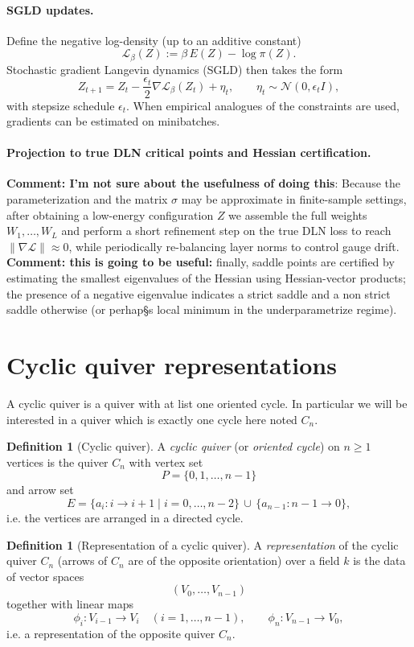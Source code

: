 \documentclass{article}
\theoremstyle{definition}
\newtheorem{definition}[theorem]{Definition}
\begin{document}
\paragraph{SGLD updates.}
Define the negative log-density (up to an additive constant)
\[
\mathcal{L}_\beta(Z) := \beta\,E(Z) - \log \pi(Z).
\]
Stochastic gradient Langevin dynamics (SGLD) then takes the form
\[
Z_{t+1}
=
Z_t
-
\frac{\epsilon_t}{2}\nabla \mathcal{L}_\beta(Z_t)
+
\eta_t,
\qquad
\eta_t \sim \mathcal{N}(0,\epsilon_t I),
\]
with stepsize schedule \(\epsilon_t\). When empirical analogues of the constraints are used, gradients can be estimated on minibatches.

\paragraph{Projection to true DLN critical points and Hessian certification.}
\textbf{Comment: I'm not sure about the usefulness of doing this}: Because the parameterization and the matrix \(\sigma\) may be approximate in finite-sample settings, after obtaining a low-energy configuration \(Z\) we assemble the full weights \(W_1,\dots,W_L\) and perform a short refinement step on the true DLN loss to reach \(\|\nabla \mathcal{\mathcal{L}}\|\approx 0\), while periodically re-balancing layer norms to control gauge drift. \textbf{Comment: this is going to be useful:} finally, saddle points are certified by estimating the smallest eigenvalues of the Hessian using Hessian-vector products; the presence of a negative eigenvalue indicates a strict saddle and a non strict saddle otherwise (or perhap§s local minimum in the underparametrize regime).

\section{Cyclic quiver representations}
A cyclic quiver is a quiver with at list one oriented cycle. In particular we will be interested in a quiver which is exactly one cycle here noted $C_n$.
\begin{definition}[Cyclic quiver]\label{def:cyclic-quiver}
A \emph{cyclic quiver} (or \emph{oriented cycle}) on $n\ge 1$ vertices is the quiver
$C_n$ with vertex set
\[
    P=\{0,1,\ldots,n-1\}
\]
and arrow set
\[
    E=\{a_i: i\to i+1\mid i=0,\ldots,n-2\}\,\cup\,\{a_{n-1}: n-1\to 0\},
\]
i.e. the vertices are arranged in a directed cycle.
\end{definition}

\begin{definition}[Representation of a cyclic quiver]\label{def:cyclic-quiver-representation}
A \emph{representation} of the cyclic quiver $C_n$ (arrows of $C_n$ are of the opposite orientation) over a field $k$ is the data of
vector spaces
\[
    (V_0,\ldots,V_{n-1})
\]
together with linear maps
\[
    \phi_{i}: V_{i-1}\to V_{i} \quad (i=1,\ldots,n-1),
    \qquad
    \phi_{n}: V_{n-1}\to V_{0},
\]
i.e. a representation of the opposite quiver $C_n$.
\end{definition}
\end{document}
